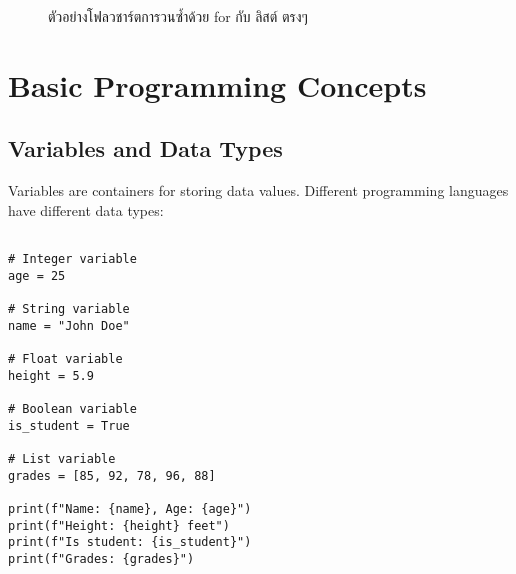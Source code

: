 \documentclass[12pt,a4paper]{article}
\begin{document}
\vspace{1.5cm}

\begin{figure}[H]
\centering
{}
\caption{ตัวอย่างโฟลวชาร์ตการวนซ้ำด้วย for กับ ลิสต์ ตรงๆ}
\end{figure}

\section{Basic Programming Concepts}

\subsection{Variables and Data Types}

Variables are containers for storing data values. Different programming languages have different data types:

\begin{codebox}{}
\begin{lstlisting}[style=python]

# Integer variable
age = 25

# String variable
name = "John Doe"

# Float variable
height = 5.9

# Boolean variable
is_student = True

# List variable
grades = [85, 92, 78, 96, 88]

print(f"Name: {name}, Age: {age}")
print(f"Height: {height} feet")
print(f"Is student: {is_student}")
print(f"Grades: {grades}")
\end{lstlisting}
\end{codebox}
\end{document}
